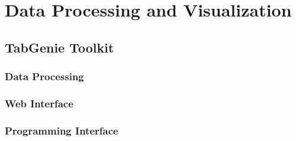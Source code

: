 
\chapter{Data Processing and Visualization}
\label{chap:tabgenie}
\section{TabGenie Toolkit}
\label{sec:tabgenie}
\subsection{Data Processing}
\label{sec:tabgenie-data}
\subsection{Web Interface}
\label{sec:tabgenie-web}
\subsection{Programming Interface}
\label{sec:tabgenie-cli}